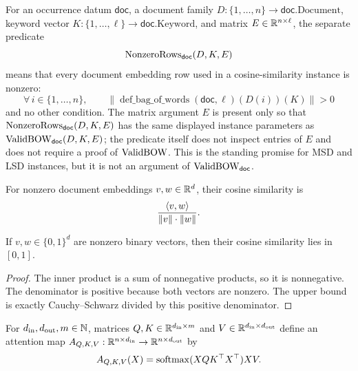 \begin{definition}
  \label{def:nonzero-document-row-promise}
  For an occurrence datum $\mathsf{doc}$, a document family
  $D:\{1,\ldots,n\}\to\mathsf{doc}.\mathrm{Document}$, keyword vector
  $K:\{1,\ldots,\ell\}\to\mathsf{doc}.\mathrm{Keyword}$, and matrix
  $E\in\mathbb{R}^{n\times\ell}$, the separate predicate
  \[
    \operatorname{NonzeroRows}_{\mathsf{doc}}(D,K,E)
  \]
  means that every document embedding row used in a cosine-similarity instance
  is nonzero:
  \[
    \forall\,i\in\{1,\ldots,n\},\qquad
    \|\operatorname{def\_bag\_of\_words}(\mathsf{doc},\ell)(D(i))(K)\|>0
  \]
  and no other condition.  The matrix argument $E$ is present only so that
  $\operatorname{NonzeroRows}_{\mathsf{doc}}(D,K,E)$ has the same displayed
  instance parameters as
  $\operatorname{ValidBOW}_{\mathsf{doc}}(D,K,E)$; the predicate itself does not
  inspect entries of $E$ and does not require a proof of $\operatorname{ValidBOW}$.  This is
  the standing promise for MSD and LSD instances, but it is not an argument of
  $\operatorname{ValidBOW}_{\mathsf{doc}}$.
\end{definition}

\begin{definition}
  \label{def:cosine-similarity}
  For nonzero document embeddings $v,w\in\mathbb{R}^d$, their cosine similarity is
  \[
    \frac{\left\langle v,w\right\rangle}{\|v\|\cdot\|w\|}.
  \]
\end{definition}

\begin{lemma}
  \label{lem:cosine-binary-range}
  If $v,w\in\{0,1\}^d$ are nonzero binary vectors, then their cosine similarity
  lies in $[0,1]$.
\end{lemma}
\begin{proof}
  The inner product is a sum of nonnegative products, so it is nonnegative.  The
  denominator is positive because both vectors are nonzero.  The upper bound is
  exactly Cauchy--Schwarz divided by this positive denominator.
\end{proof}

\begin{definition}
  \label{def:attention}
  For $d_{\rm in},d_{\rm out},m\in\mathbb{N}$, matrices
  $Q,K\in\mathbb{R}^{d_{\rm in}\times m}$ and $V\in\mathbb{R}^{d_{\rm in}\times d_{\rm out}}$
  define an attention map $A_{Q,K,V}:\mathbb{R}^{n\times d_{\rm in}}\to
  \mathbb{R}^{n\times d_{\rm out}}$ by
  \[
    A_{Q,K,V}(X)=\operatorname{softmax}(XQK^\top X^\top)XV.
  \]
\end{definition}

